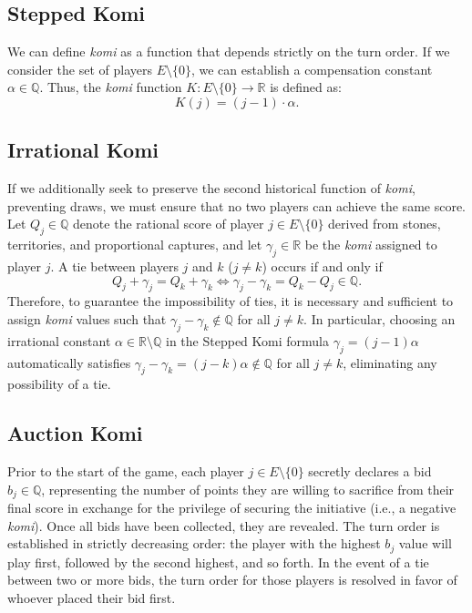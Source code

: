 \subsection*{Stepped Komi}
We can define \textit{komi} as a function that depends strictly on the turn order. If we consider the set of players $E \setminus \{0\}$, we can establish a compensation constant $\alpha \in \mathbb{Q}$. Thus, the \textit{komi} function $K: E \setminus \{0\} \to \mathbb{R}$ is defined as:
$$K(j) = (j - 1) \cdot \alpha.$$

\subsection*{Irrational Komi}
If we additionally seek to preserve the second historical function of \textit{komi}, preventing draws, we must ensure that no two players can achieve the same score. Let $Q_j \in \mathbb{Q}$ denote the rational score of player $j \in E \setminus \{0\}$ derived from stones, territories, and proportional captures, and let $\gamma_j \in \mathbb{R}$ be the \textit{komi} assigned to player $j$. A tie between players $j$ and $k$ ($j \neq k$) occurs if and only if
$$Q_j + \gamma_j = Q_k + \gamma_k \iff \gamma_j - \gamma_k = Q_k - Q_j \in \mathbb{Q}.$$
Therefore, to guarantee the impossibility of ties, it is necessary and sufficient to assign \textit{komi} values such that $\gamma_j - \gamma_k \notin \mathbb{Q}$ for all $j \neq k$. In particular, choosing an irrational constant $\alpha \in \mathbb{R} \setminus \mathbb{Q}$ in the Stepped Komi formula $\gamma_j = (j - 1)\alpha$ automatically satisfies $\gamma_j - \gamma_k = (j - k)\alpha \notin \mathbb{Q}$ for all $j \neq k$, eliminating any possibility of a tie.

\subsection*{Auction Komi}
Prior to the start of the game, each player $j \in E \setminus \{0\}$ secretly declares a bid $b_j \in \mathbb{Q}$, representing the number of points they are willing to sacrifice from their final score in exchange for the privilege of securing the initiative (i.e., a negative \textit{komi}). Once all bids have been collected, they are revealed. The turn order is established in strictly decreasing order: the player with the highest $b_j$ value will play first, followed by the second highest, and so forth. In the event of a tie between two or more bids, the turn order for those players is resolved in favor of whoever placed their bid first.

